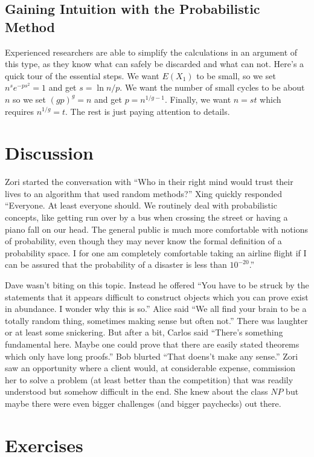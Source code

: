 \subsection{Gaining Intuition with the Probabilistic Method}

Experienced researchers are able to simplify the calculations in
an argument of this type, as they know what can safely be discarded
and what can not.   Here's a quick tour of the essential steps.
We want $E(X_1)$ to be small, so we set $n^se^{-ps^2}=1$ and
get $s=\ln n/p$.  We want the number of small cycles to be about
$n$ so we set $(gp)^g=n$ and get $p=n^{1/g-1}$.  Finally, we want
$n=st$ which requires $n^{1/g}=t$.  The rest is just paying attention
to details.

\section{Discussion}

Zori started the conversation with ``Who in their right
mind would trust their lives to an algorithm that used random
methods?''  Xing quickly responded ``Everyone.  At least everyone
should.  We routinely deal with probabilistic concepts, like
getting run over by a bus when crossing the street or having
a piano fall on our head.  The general public is much more
comfortable with notions of probability, even though they
may never know the formal definition of a probability space.
I for one am completely comfortable taking an airline flight
if I can be assured that the probability of a disaster is
less than $10^{-20}$.''

Dave wasn't biting on this topic.  Instead he offered ``You have
to be struck by the statements that it appears difficult to
construct objects which you can prove exist in abundance. I wonder
why this is so.''  Alice said ``We all find your brain to be
a totally random thing, sometimes making sense but often not.''
There was laughter or at least some snickering.  But after a bit,
Carlos said ``There's something fundamental here.  Maybe one
could prove that there are easily stated theorems which
only have long proofs.'' Bob blurted ``That doens't make any
sense.''  Zori saw an opportunity where a client would,
at considerable expense, commission her to solve a problem
(at least better than the competition) that was readily understood 
but somehow difficult in the end.   She knew about the class
$NP$ but maybe there were even bigger challenges (and bigger
paychecks) out there.

\section{Exercises}\label{exercises:ramsey}

